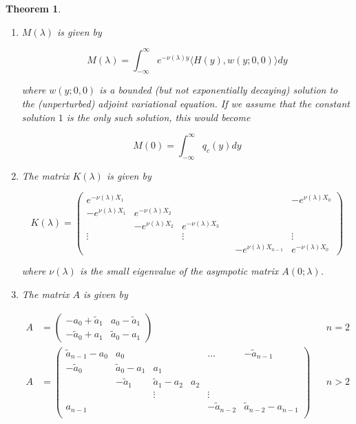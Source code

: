 \documentclass[12pt]{article}
\newtheorem{theorem}{Theorem}
\begin{document}
\begin{theorem}
\begin{enumerate}
\begin{equation*}
M =  \int_{-\infty}^\infty q(y) q_c(y) dy
\end{equation*}

\item $M(\lambda)$ is given by

\begin{equation}
M(\lambda) = \int_{-\infty}^\infty e^{-\nu(\lambda)y} \langle H(y), w(y; 0, 0) \rangle dy
\end{equation}

where $w(y; 0, 0)$ is a bounded (but not exponentially decaying) solution to the (unperturbed) adjoint variational equation. If we assume that the constant solution $1$ is the only such solution, this would become

\begin{equation*}
M(0) =  \int_{-\infty}^\infty q_c(y) dy
\end{equation*}

\item The matrix $K(\lambda)$ is given by

\begin{equation}\label{blockdiag}
K(\lambda) = 
\begin{pmatrix}
e^{-\nu(\lambda)X_1} & & & & & -e^{\nu(\lambda)X_0} \\
-e^{\nu(\lambda)X_1} & e^{-\nu(\lambda)X_2} \\
& -e^{\nu(\lambda)X_2} & e^{-\nu(\lambda)X_3} \\
\vdots & & \vdots & &&  \vdots \\
& & & & -e^{\nu(\lambda)X_{n-1}} & e^{-\nu(\lambda)X_0} 
\end{pmatrix}
\end{equation}

where $\nu(\lambda)$ is the small eigenvalue of the asympotic matrix $A(0; \lambda)$.

\item The matrix $A$ is given by

\begin{align*}
A &= \begin{pmatrix}
-a_0 + \tilde{a}_1 & a_0 - \tilde{a}_1 \\
-\tilde{a}_0 + a_1 & \tilde{a}_0 - a_1
\end{pmatrix} && n = 2 \\
A &= \begin{pmatrix}
\tilde{a}_{n-1} - a_0 & a_0 & & & \dots & -\tilde{a}_{n-1}\\
-\tilde{a}_0 & \tilde{a}_0 - a_1 &  a_1 \\
& -\tilde{a}_1 & \tilde{a}_1 - a_2 &  a_2 \\
& & \vdots & & \vdots \\
a_{n-1} & & & & -\tilde{a}_{n-2} & \tilde{a}_{n-2} - a_{n-1} \\
\end{pmatrix} && n > 2
\end{align*}


\end{enumerate}
\end{theorem}
\end{document}
